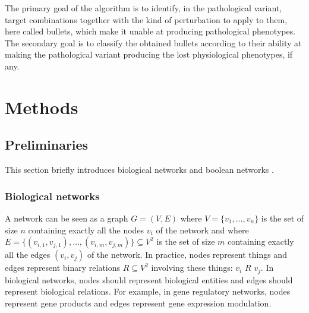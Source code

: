 \documentclass[oneside,a4paper,onecolumn,notitlepage,final]{article}
\begin{document}
The primary goal of the algorithm is to identify, in the pathological variant, target combinations together with the kind of perturbation to apply to them, here called bullets, which make it unable at producing pathological phenotypes. The secondary goal is to classify the obtained bullets according to their ability at making the pathological variant producing the lost physiological phenotypes, if any.

\section{Methods}
\subsection{Preliminaries}
This section briefly introduces biological networks \cite{zhu2007getting} and boolean networks \cite{saadatpour2012boolean}.

\subsubsection{Biological networks}
A network can be seen as a graph $G=(V,E)$ where $V=\lbrace v_1,\dots,v_n\rbrace$ is the set of size $n$ containing exactly all the nodes $v_i$ of the network and where $E=\lbrace (v_{i,1},v_{j,1}),\dots,(v_{i,m},v_{j,m})\rbrace \subseteq V^2$ is the set of size $m$ containing exactly all the edges $(v_{i},v_{j})$ of the network. In practice, nodes represent things and edges represent binary relations $R\subseteq V^2$ involving these things: $v_{i}$ $R$ $v_{j}$. In biological networks, nodes should represent biological entities and edges should represent biological relations. For example, in gene regulatory networks, nodes represent gene products and edges represent gene expression modulation.
\end{document}
